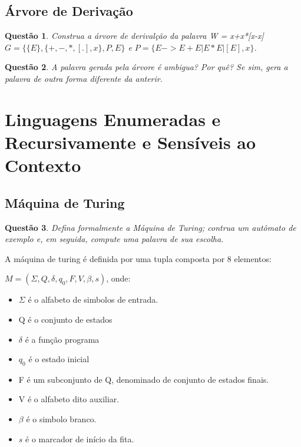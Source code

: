 \documentclass{article}
\newtheorem{problem}{Questão}
\begin{document}
    \subsection{Árvore de Derivação}
    
    \begin{problem}
         Construa a árvore de derivalção da palavra W = x+x*[x-x] $G = \{ \{E\},\{+,-,*,[.],x\},P,E\}$ e $P = \{ E -> E+E | E*E | [E] , x\}$.  
    \end{problem}
    \begin{solution}
        
    \end{solution}
    \begin{problem}
         A palavra gerada pela árvore é ambigua? Por quê? Se sim, gera a palavra de outra forma diferente da anterir.  
    \end{problem}
\begin{solution}
        
    \end{solution}
\section{Linguagens Enumeradas e Recursivamente e Sensíveis ao Contexto}

    \subsection{Máquina de Turing}
        \begin{problem}
                Defina formalmente a Máquina de Turing; contrua um autômato de exemplo e, em seguida, compute uma palavra de sua escolha.
        \end{problem}
    \begin{solution}
    A máquina de turing é definida por uma tupla composta por 8 elementos:
    
    $M = (\Sigma, Q, \delta, q_0, F, V,\beta, s)$, onde:
    
    \begin{itemize}
        \item $\Sigma$ é o alfabeto de simbolos de entrada.
        \item Q é o conjunto de estados
        \item $\delta$ é a função programa
        \item $q_0$ é o estado inicial
        \item F é um subconjunto  de Q, denominado de conjunto de estados finais.
        \item V é o alfabeto dito auxiliar.
        \item $\beta$ é o simbolo branco.
        \item $s$ é o marcador de início da fita.
    \end{itemize}
    \end{solution}
\end{document}
